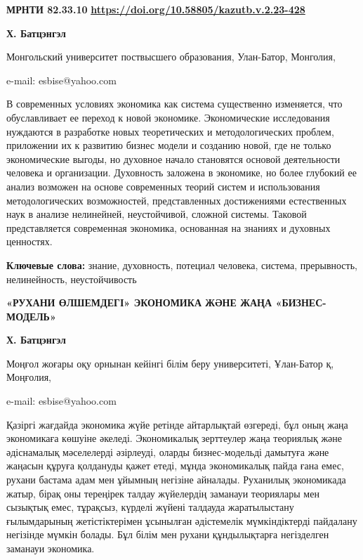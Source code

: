 \newpage
{\bfseries МРНТИ 82.33.10}
\hfill {\bfseries \href{https://doi.org/10.58805/kazutb.v.2.23-428}{https://doi.org/10.58805/kazutb.v.2.23-428}}


\begin{center}
{\bfseries Х. Батцэнгэл}

Монгольский университет поствысшего образования, Улан-Батор, Монголия,

e-mail: esbise@yahoo.com
\end{center}

В современных условиях экономика как система существенно изменяется, что
обуславливает ее переход к новой экономике. Экономические исследования
нуждаются в разработке новых теоретических и методологических проблем,
приложении их к развитию бизнес модели и созданию новой, где не только
экономические выгоды, но духовное начало становятся основой деятельности
человека и организации. Духовность заложена в экономике, но более
глубокий ее анализ возможен на основе современных теорий систем и
использования методологических возможностей, представленных достижениями
естественных наук в анализе нелинейней, неустойчивой, сложной системы.
Таковой представляется современная экономика, основанная на знаниях и
духовных ценностях.

{\bfseries Ключевые слова:} знание, духовность, потециал человека, система,
прерывность, нелинейность, неустойчивость

\begin{center}
{\large\bfseries «РУХАНИ ӨЛШЕМДЕГІ» ЭКОНОМИКА ЖӘНЕ ЖАҢА «БИЗНЕС-МОДЕЛЬ»}

{\bfseries Х. Батцэнгэл}

Моңғол жоғары оқу орнынан кейінгі білім беру университеті, Ұлан-Батор қ,
Моңғолия,

e-mail: esbise@yahoo.com
\end{center}

Қазіргі жағдайда экономика жүйе ретінде айтарлықтай өзгереді, бұл оның
жаңа экономикаға көшуіне әкеледі. Экономикалық зерттеулер жаңа теориялық
және әдіснамалық мәселелерді әзірлеуді, оларды бизнес-модельді дамытуға
және жаңасын құруға қолдануды қажет етеді, мұнда экономикалық пайда ғана
емес, рухани бастама адам мен ұйымның негізіне айналады. Руханилық
экономикада жатыр, бірақ оны тереңірек талдау жүйелердің заманауи
теориялары мен сызықтық емес, тұрақсыз, күрделі жүйені талдауда
жаратылыстану ғылымдарының жетістіктерімен ұсынылған әдістемелік
мүмкіндіктерді пайдалану негізінде мүмкін болады. Бұл білім мен рухани
құндылықтарға негізделген заманауи экономика.

